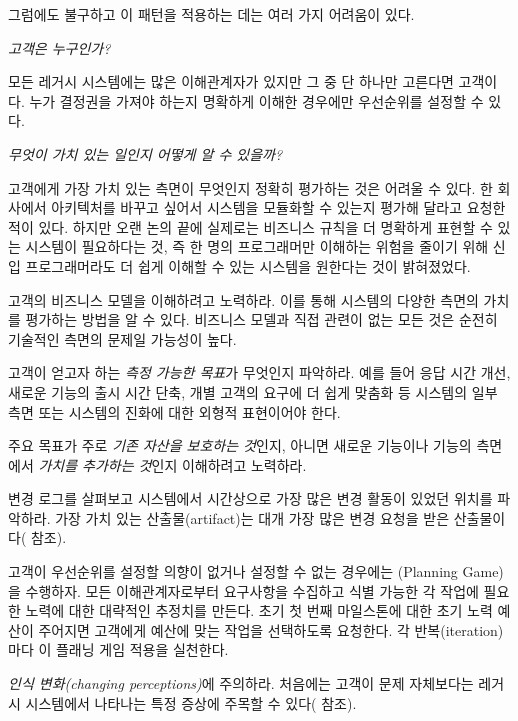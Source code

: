 \documentclass[a4paper,10pt,twoside]{book}
\begin{document}
그럼에도 불구하고 이 패턴을 적용하는 데는 여러 가지 어려움이 있다.

\emph{고객은 누구인가?}

\begin{bulletlist}
  \item 모든 레거시 시스템에는 많은 이해관계자가 있지만 그 중 단 하나만 고른다면 고객이다. 누가 결정권을 가져야 하는지 명확하게 이해한 경우에만 우선순위를 설정할 수 있다.
\end{bulletlist}

\emph{무엇이 가치 있는 일인지 어떻게 알 수 있을까?}

\begin{bulletlist}
  \item 고객에게 가장 가치 있는 측면이 무엇인지 정확히 평가하는 것은 어려울 수 있다. 한 회사에서 아키텍처를 바꾸고 싶어서 시스템을 모듈화할 수 있는지 평가해 달라고 요청한 적이 있다. 하지만 오랜 논의 끝에 실제로는 비즈니스 규칙을 더 명확하게 표현할 수 있는 시스템이 필요하다는 것, 즉 한 명의 프로그래머만 이해하는 위험을 줄이기 위해 신입 프로그래머라도 더 쉽게 이해할 수 있는 시스템을 원한다는 것이 밝혀졌었다.

  \item 고객의 비즈니스 모델을 이해하려고 노력하라. 이를 통해 시스템의 다양한 측면의 가치를 평가하는 방법을 알 수 있다. 비즈니스 모델과 직접 관련이 없는 모든 것은 순전히 기술적인 측면의 문제일 가능성이 높다. 

  \item 고객이 얻고자 하는  \emph{측정 가능한 목표}가 무엇인지 파악하라. 예를 들어 응답 시간 개선, 새로운 기능의 출시 시간 단축, 개별 고객의 요구에 더 쉽게 맞춤화 등 시스템의 일부 측면 또는 시스템의 진화에 대한 외형적 표현이어야 한다.

  \item 주요 목표가 주로 \emph{기존 자산을 보호하는 것}인지, 아니면 새로운 기능이나 기능의 측면에서 \emph{가치를 추가하는 것}인지 이해하려고 노력하라.

  \item 변경 로그를 살펴보고 시스템에서 시간상으로 가장 많은 변경 활동이 있었던 위치를 파악하라. 가장 가치 있는 산출물(artifact)는 대개 가장 많은 변경 요청을 받은 산출물이다( 참조). 

  \item 고객이 우선순위를 설정할 의향이 없거나 설정할 수 없는 경우에는 (Planning Game)을 수행하자\cite{Beck01a}. 모든 이해관계자로부터 요구사항을 수집하고 식별 가능한 각 작업에 필요한 노력에 대한 대략적인 추정치를 만든다. 초기 첫 번째 마일스톤에 대한 초기 노력 예산이 주어지면 고객에게 예산에 맞는 작업을 선택하도록 요청한다. 각 반복(iteration)마다 이 플래닝 게임 적용을 실천한다.

  \item \emph{인식 변화(changing perceptions)}에 주의하라. 처음에는 고객이 문제 자체보다는 레거시 시스템에서 나타나는 특정 증상에 주목할 수 있다( 참조). 
\end{bulletlist}
\end{document}
